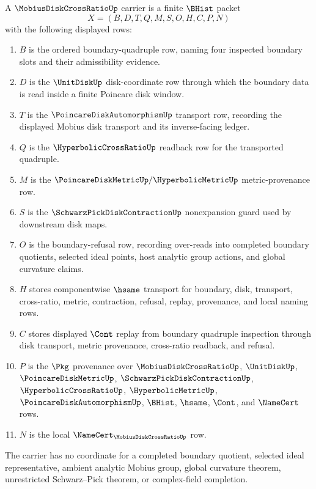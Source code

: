 \begin{definition}
\label{def:mobius-disk-cross-ratio-carrier}
A $\MobiusDiskCrossRatioUp$ carrier is a finite $\BHist$ packet
$$
X=(B,D,T,Q,M,S,O,H,C,P,N)
$$
with the following displayed rows:
\begin{enumerate}
\item $B$ is the ordered boundary-quadruple row, naming four inspected boundary slots and their admissibility evidence.
\item $D$ is the $\UnitDiskUp$ disk-coordinate row through which the boundary data is read inside a finite Poincare disk window.
\item $T$ is the $\PoincareDiskAutomorphismUp$ transport row, recording the displayed Mobius disk transport and its inverse-facing ledger.
\item $Q$ is the $\HyperbolicCrossRatioUp$ readback row for the transported quadruple.
\item $M$ is the $\PoincareDiskMetricUp/\HyperbolicMetricUp$ metric-provenance row.
\item $S$ is the $\SchwarzPickDiskContractionUp$ nonexpansion guard used by downstream disk maps.
\item $O$ is the boundary-refusal row, recording over-reads into completed boundary quotients, selected ideal points, host analytic group actions, and global curvature claims.
\item $H$ stores componentwise $\hsame$ transport for boundary, disk, transport, cross-ratio, metric, contraction, refusal, replay, provenance, and local naming rows.
\item $C$ stores displayed $\Cont$ replay from boundary quadruple inspection through disk transport, metric provenance, cross-ratio readback, and refusal.
\item $P$ is the $\Pkg$ provenance over $\MobiusDiskCrossRatioUp$, $\UnitDiskUp$, $\PoincareDiskMetricUp$, $\SchwarzPickDiskContractionUp$, $\HyperbolicCrossRatioUp$, $\HyperbolicMetricUp$, $\PoincareDiskAutomorphismUp$, $\BHist$, $\hsame$, $\Cont$, and $\NameCert$ rows.
\item $N$ is the local $\NameCert_{\MobiusDiskCrossRatioUp}$ row.
\end{enumerate}
The carrier has no coordinate for a completed boundary quotient, selected ideal representative, ambient analytic Mobius group, global curvature theorem, unrestricted Schwarz--Pick theorem, or complex-field completion.
\end{definition}

